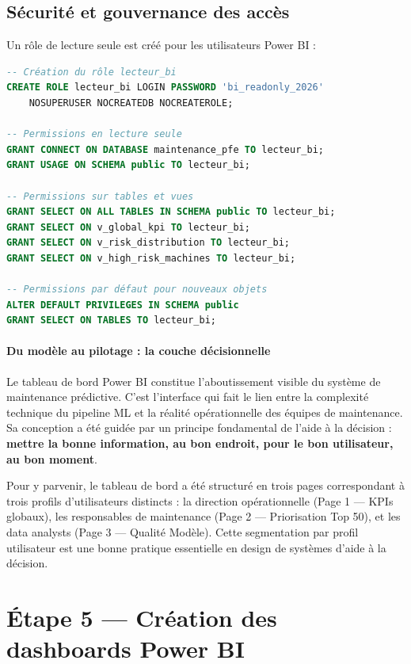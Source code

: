 \documentclass[a4paper,12pt]{report}
\begin{document}
\subsection{Sécurité et gouvernance des accès}

Un rôle de lecture seule est créé pour les utilisateurs Power BI :

\begin{lstlisting}[language=sql]
-- Création du rôle lecteur_bi
CREATE ROLE lecteur_bi LOGIN PASSWORD 'bi_readonly_2026'
    NOSUPERUSER NOCREATEDB NOCREATEROLE;

-- Permissions en lecture seule
GRANT CONNECT ON DATABASE maintenance_pfe TO lecteur_bi;
GRANT USAGE ON SCHEMA public TO lecteur_bi;

-- Permissions sur tables et vues
GRANT SELECT ON ALL TABLES IN SCHEMA public TO lecteur_bi;
GRANT SELECT ON v_global_kpi TO lecteur_bi;
GRANT SELECT ON v_risk_distribution TO lecteur_bi;
GRANT SELECT ON v_high_risk_machines TO lecteur_bi;

-- Permissions par défaut pour nouveaux objets
ALTER DEFAULT PRIVILEGES IN SCHEMA public 
GRANT SELECT ON TABLES TO lecteur_bi;
\end{lstlisting}


\paragraph{Du modèle au pilotage : la couche décisionnelle}

Le tableau de bord Power BI constitue l'aboutissement visible du système de maintenance prédictive. C'est l'interface qui fait le lien entre la complexité technique du pipeline ML et la réalité opérationnelle des équipes de maintenance. Sa conception a été guidée par un principe fondamental de l'aide à la décision : \textbf{mettre la bonne information, au bon endroit, pour le bon utilisateur, au bon moment}.

Pour y parvenir, le tableau de bord a été structuré en trois pages correspondant à trois profils d'utilisateurs distincts : la direction opérationnelle (Page 1 — KPIs globaux), les responsables de maintenance (Page 2 — Priorisation Top 50), et les data analysts (Page 3 — Qualité Modèle). Cette segmentation par profil utilisateur est une bonne pratique essentielle en design de systèmes d'aide à la décision.

\section{Étape 5 — Création des dashboards Power BI}
\end{document}
